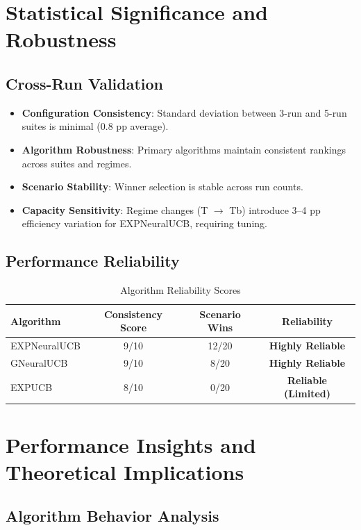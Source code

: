 \documentclass[11pt,a4paper]{article}
\newcommand{\critical}[1]{\textcolor{criticalcolor}{\textbf{#1}}}
\newcommand{\success}[1]{\textcolor{successcolor}{\textbf{#1}}}
\begin{document}
\section{Statistical Significance and Robustness}

\subsection{Cross-Run Validation}

\begin{itemize}
\item \success{Configuration Consistency}: Standard deviation between 3-run and 5-run suites is minimal (0.8 pp average).
\item \success{Algorithm Robustness}: Primary algorithms maintain consistent rankings across suites and regimes.
\item \success{Scenario Stability}: Winner selection is stable across run counts.
\item \critical{Capacity Sensitivity}: Regime changes (T $\rightarrow$ Tb) introduce 3--4 pp efficiency variation for EXPNeuralUCB, requiring tuning.
\end{itemize}

\subsection{Performance Reliability}

\begin{table}[H]
\centering
\caption{Algorithm Reliability Scores}
\begin{tabular}{|l|c|c|c|}
\hline
\textbf{Algorithm} & \textbf{Consistency Score} & \textbf{Scenario Wins} & \textbf{Reliability} \\
\hline
\hline
EXPNeuralUCB & 9/10 & 12/20 & \success{Highly Reliable} \\
GNeuralUCB   & 9/10 & 8/20  & \success{Highly Reliable} \\
EXPUCB       & 8/10 & 0/20  & \success{Reliable (Limited)} \\
\hline
\end{tabular}
\end{table}

\section{Performance Insights and Theoretical Implications}

\subsection{Algorithm Behavior Analysis}
\end{document}
